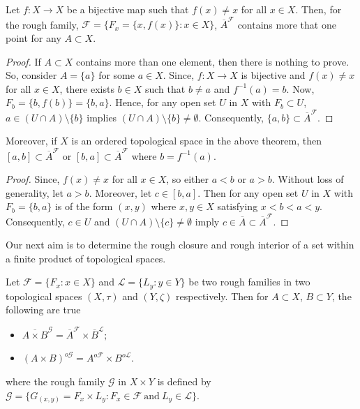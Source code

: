 \documentclass[11pt]{amsart}
\begin{document}
\begin{theorem}
    Let $f: X\to X$ be a bijective map such that $f(x)\neq x$ for all $x\in X$. Then, for the rough family, $\mathscr{F}=\{F_x=\{x,f(x)\}: x\in X\}$, $\overline{A}^{\mathscr{F}}$ contains more that one point for any $A\subset X$.
\end{theorem}


\begin{proof}
    If $A\subset X$ contains more than one element, then there is nothing to prove. So, consider $A=\{a\}$ for some $a\in X$. Since, $f: X\to X$ is bijective and $f(x)\neq x$ for all $x\in X$, there exists $b\in X$ such that $b\neq a$ and $f^{-1}(a)=b$. Now, $F_b=\{b,f(b)\}=\{b,a\}$. Hence, for any open set $U$ in $X$ with $F_b\subset U$, $a\in (U\cap A)\setminus \{b\}$ implies $(U\cap A)\setminus \{b\}\neq \emptyset$. Consequently, $\{a,b\}\subset \overline{A}^{\mathscr{F}}$.
\end{proof}

\begin{corollary}
    Moreover, if $X$ is an ordered topological space in the above theorem, then $[a,b]\subset  \overline{A}^\mathscr{F}$ or $[b,a]\subset  \overline{A}^\mathscr{F}$ where $b=f^{-1}(a)$.
\end{corollary}

\begin{proof}
    Since, $f(x)\neq x$ for all $x\in X$, so either $a<b$ or $a>b$. Without loss of generality, let $a>b$. Moreover, let $c\in [b, a]$. Then for any open set $U$ in $X$ with $F_b=\{b,a\}$  is of the form $(x,y)$ where $x,y\in X$ satisfying $x<b<a<y$. Consequently, $c\in U$ and $(U\cap A)\setminus \{c\}\neq \emptyset$ imply $c\in \overline{A}\subset \overline{A}^\mathscr{F}$. 
\end{proof}


Our next aim is to determine the rough closure and rough interior of a set within a finite product of topological spaces.

\begin{theorem}\label{Th2.5}
     Let $\mathscr{F}=\{F_x: x\in X\}$ and $\mathscr{L}=\{L_y: y\in Y\}$ be two rough families in two topological spaces \((X,\tau)\) and \((Y,\zeta)\) respectively. Then for $A\subset X$, $B\subset Y$, the following are true 
     \begin{itemize}
         \item[(i)] $\overline{A\times B}^{\mathcal{G}}=\overline{A}^\mathscr{F}\times \overline{B}^{\mathscr{L}};$
         \item[(ii)] $(A\times B)^{o\mathcal{G}}=A^{o\mathscr{F}}\times B^{o\mathscr{L}}$. 
     \end{itemize}
     where the rough family $\mathcal{G}$ in $X\times Y$ is defined by $\mathcal{G}=\{G_{(x,y)}=F_x\times L_y: F_x\in \mathscr{F}~\text{and}~L_y\in \mathscr{L}\}$.
\end{theorem}
\end{document}
